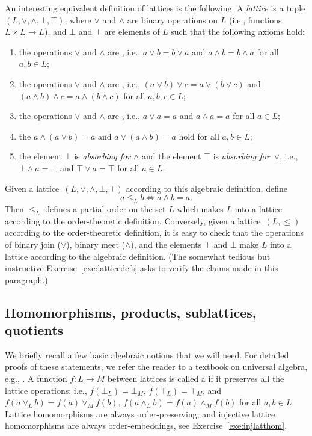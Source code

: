 An interesting equivalent definition of lattices is the following. A \emph{lattice} is a tuple $(L,\vee,\wedge,\bot,\top)$, where $\vee$ and $\wedge$ are binary operations on $L$ (i.e., functions $L \times L \to L$), and $\bot$ and $\top$ are elements of $L$ such that the following axioms hold:
\begin{enumerate}
\item the operations $\vee$ and $\wedge$ are , i.e., ${a \vee b = b \vee a}$ and \newline${a \wedge b = b \wedge a}$ for all $a, b \in L$;
\item the operations $\vee$ and $\wedge$ are , i.e., ${(a \vee b) \vee c = a \vee (b \vee c)}$ and ${(a \wedge b) \wedge c = a \wedge (b \wedge c)}$ for all $a, b, c \in L$;
\item the operations $\vee$ and $\wedge$ are , i.e., $a \vee a = a$ and $a \wedge a = a$ for all $a \in L$;
\item the  $a \wedge (a \vee b) = a$ and $a \vee (a \wedge b) = a$ hold for all $a, b \in L$;
\item the element $\bot$ is \emph{absorbing for $\wedge$} and the element $\top$ is \emph{absorbing for~$\vee$}, i.e., $\bot \wedge a = \bot$ and $\top \vee a = \top$ for all $a \in L$.%
\end{enumerate}
Given a lattice~$(L,\vee,\wedge,\bot,\top)$ according to this algebraic definition, define
\[ a \leq_L b \iff a \wedge b = a.\]
Then $\leq_L$ defines a partial order on the set $L$ which makes $L$ into a lattice according to the order-theoretic definition. Conversely, given a lattice~${(L,\leq)}$ according to the order-theoretic definition, it is easy to check that the operations of binary join ($\vee$), binary meet ($\wedge$), and the elements $\top$ and $\bot$ make $L$ into a lattice according to the algebraic definition. (The somewhat tedious but instructive Exercise~\ref{exe:latticedefs} asks to verify the claims made in this paragraph.)\\

\subsection*{Homomorphisms, products, sublattices, quotients}
We briefly recall a few basic algebraic notions that we will need. For detailed proofs of these statements, we refer the reader to a textbook on universal algebra, e.g., \cite{BurSan2000}.
A function $f \colon L \to M$ between lattices is called a  if it preserves all the lattice operations; i.e., $f(\bot_L) = \bot_M$, $f(\top_L) = \top_M$, and $f(a \vee_L b) = f(a) \vee_M f(b)$, $f(a \wedge_L b) = f(a) \wedge_M f(b)$ for all $a, b \in L$. Lattice homomorphisms are always order-preserving, and injective lattice homomorphisms are always order-embeddings, see Exercise~\ref{exe:injlatthom}.

